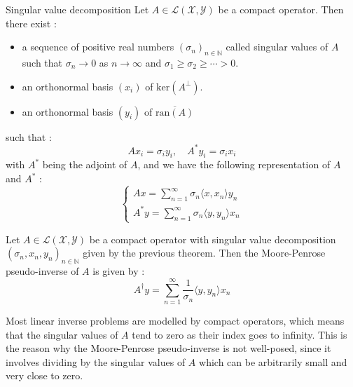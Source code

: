 \begin{theorem}{Singular value decomposition}
    Let $A \in \mathcal{L}(\mathcal{X}, \mathcal{Y})$ be a compact operator. Then there exist :
    
    \begin{itemize}
        \item a sequence of positive real numbers $(\sigma_n)_{n \in \mathbb{N}}$ called singular values of $A$ such that $\sigma_n \to 0$ as $n \to \infty$ and $\sigma_1 \geq \sigma_2 \geq \cdots > 0$.
        \item an orthonormal basis $(x_i)$ of $\text{ker}(A^\perp)$.
        \item an orthonormal basis $(y_i)$ of $\overline{\text{ran}(A)}$
    \end{itemize}
        such that :
    \begin{equation*}
        A x_i = \sigma_i y_i, \quad A^* y_i = \sigma_i x_i
    \end{equation*}
    with $A^*$ being the adjoint of $A$, and we have the following representation of $A$ and $A^*$ :
    \begin{equation*}
        \begin{cases}
            \displaystyle A x = \sum_{n=1}^\infty \sigma_n \langle x, x_n \rangle y_n \\
            \displaystyle A^* y = \sum_{n=1}^\infty \sigma_n \langle y, y_n \rangle x_n
        \end{cases}
    \end{equation*}
\end{theorem}

\begin{theorem}
    Let $A \in \mathcal{L}(\mathcal{X}, \mathcal{Y})$ be a compact operator with singular value decomposition \newline $(\sigma_n, x_n, y_n)_{n \in \mathbb{N}}$ given by the previous theorem. 
    Then the Moore-Penrose pseudo-inverse of $A$ is given by :
    \begin{equation*}
        A^\dagger y = \sum_{n=1}^\infty \frac{1}{\sigma_n} \langle y, y_n \rangle x_n
    \end{equation*}
\end{theorem}

Most linear inverse problems are modelled by compact operators, which means that the singular values of $A$ tend to zero as their index goes to infinity. This is the reason why the Moore-Penrose pseudo-inverse is not well-posed, since it involves dividing by the singular values of $A$ which can be arbitrarily small and very close to zero.

